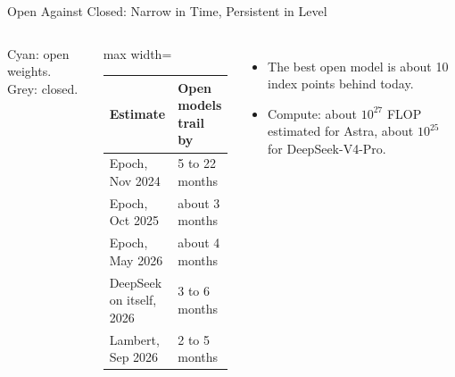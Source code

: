 \begin{frame}{Open Against Closed: Narrow in Time, Persistent in Level}
\begin{columns}[T,onlytextwidth]
        {\scriptsize Cyan: open weights. Grey: closed.}
        \centering
        \small
        \renewcommand{\arraystretch}{1.12}
        \begin{adjustbox}{max width=\linewidth}\begin{tabular}{ll}
            \toprule
            \textbf{Estimate} & \textbf{Open models trail by} \\
            \midrule
            Epoch, Nov 2024 & 5 to 22 months \\
            Epoch, Oct 2025 & about 3 months \\
            Epoch, May 2026 & about 4 months \\
            DeepSeek on itself, 2026 & 3 to 6 months \\
            Lambert, Sep 2026 & 2 to 5 months \\
            \bottomrule
        \end{tabular}\end{adjustbox}
        \begin{itemize}\itemsep0.3em
            \item The best open model is about 10 index points behind today.
            \item Compute: about $10^{27}$ FLOP estimated for Astra, about $10^{25}$ for DeepSeek-V4-Pro.
        \end{itemize}
    \end{columns}
    \vspace{0.2em}
\end{frame}

